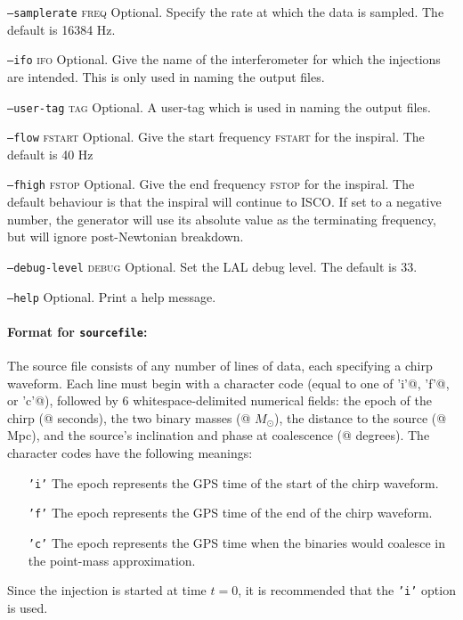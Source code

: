 \begin{entry}
\begin{entry}
\item[\texttt{--samplerate} \textsc{freq}] Optional.  Specify the rate at which
the data is sampled.  The default is 16384 Hz.

\item[\texttt{--ifo} \textsc{ifo}] Optional.  Give the name of the
interferometer for which the injections are intended.  This is only used in
naming the output files.

\item[\texttt{--user-tag} \textsc{tag}] Optional.  A user-tag which is
used in naming the output files.

\item[\texttt{--flow} \textsc{fstart}] Optional.  Give the start frequency
\textsc{fstart} for the inspiral.  The default is 40 Hz

\item[\texttt{--fhigh} \textsc{fstop}] Optional.  Give the end frequency
\textsc{fstop} for the inspiral.  The default behaviour is that the inspiral
will continue to ISCO.  If set to a negative number, the generator will use its
absolute value as the terminating frequency, but will ignore post-Newtonian
breakdown. 

\item[\texttt{--debug-level} \textsc{debug}]  Optional.  Set the LAL debug
level.  The default is 33.

\item[\texttt{--help}] Optional.  Print a help message.
\end{entry}

\paragraph{Format for \texttt{sourcefile}:} The source file consists
of any number of lines of data, each specifying a chirp waveform.
Each line must begin with a character code (\verb@CHAR@ equal to one
of \verb@'i'@, \verb@'f'@, or \verb@'c'@), followed by 6
whitespace-delimited numerical fields: the epoch of the chirp
(@ seconds), the two binary masses (@
$M_\odot$), the distance to the source (@ Mpc), and the
source's inclination and phase at coalescence (@ degrees).
The character codes have the following meanings:
\begin{itemize}
\item[\texttt{'i'}] The epoch represents the GPS time of the start of
the chirp waveform.
\item[\texttt{'f'}] The epoch represents the GPS time of the end of
the chirp waveform.
\item[\texttt{'c'}] The epoch represents the GPS time when the
binaries would coalesce in the point-mass approximation.
\end{itemize}
Since the injection is started at time $t=0$, it is recommended that the
\texttt{'i'} option is used.


\end{entry}
